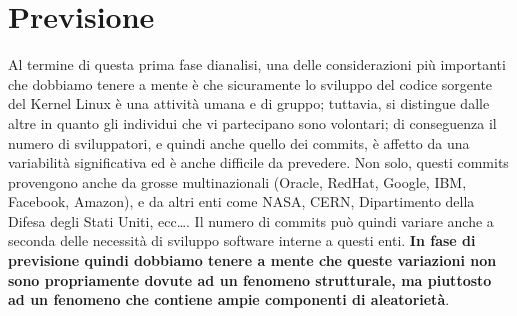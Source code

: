 \documentclass[11pt,a4paper]{article}
\begin{document}
\section{Previsione}
Al termine di questa prima fase dianalisi, una delle considerazioni pi\`u
importanti che dobbiamo tenere a mente \`e che sicuramente lo sviluppo del
codice sorgente del Kernel Linux \`e una attivit\`a umana e di gruppo; tuttavia,
si distingue dalle altre in quanto gli individui che vi partecipano sono
volontari; di conseguenza il numero di sviluppatori, e quindi anche quello dei
commits, \`e affetto da una variabilit\`a significativa ed \`e anche difficile
da prevedere. Non solo, questi commits provengono anche da grosse multinazionali
(Oracle, RedHat, Google, IBM, Facebook, Amazon), e da altri enti come NASA,
CERN, Dipartimento della Difesa degli Stati Uniti, ecc\dots. Il numero di
commits pu\`o quindi variare anche a seconda delle necessit\`a di sviluppo
software interne a questi enti. \textbf{In fase di previsione quindi dobbiamo
tenere a mente che queste variazioni non sono propriamente dovute ad un fenomeno
strutturale, ma piuttosto ad un fenomeno che contiene ampie componenti di
aleatoriet\`a}.
\end{document}
